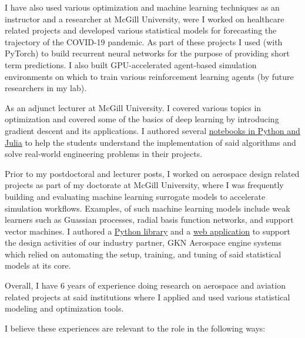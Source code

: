 \documentclass[12pt]{article} %
\begin{document}
I have also used various optimization and machine learning techniques as an instructor and a researcher at McGill University, were I worked on healthcare related projects and developed various statistical models for forecasting the trajectory of the COVID-19 pandemic. As part of these projects I used (with PyTorch) to build recurrent neural networks for the purpose of providing short term predictions. I also built GPU-accelerated agent-based simulation environments on which to train various reinforcement learning agents (by future researchers in my lab). 
\medskip %

As an adjunct lecturer at McGill University. I covered various topics in optimization and covered some of the basics of deep learning by introducing gradient descent and its applications. I authored several \href{https://github.com/khbalhandawi/MECH559_notebooks}{notebooks in Python and Julia} to help the students understand the implementation of said algorithms and solve real-world engineering problems in their projects.
\medskip %

Prior to my postdoctoral and lecturer posts, I worked on aerospace design related projects as part of my doctorate at McGill University, where I was frequently building and evaluating machine learning surrogate models to accelerate simulation workflows. Examples, of such machine learning models include weak learners such as Guassian processes, radial basis function networks, and support vector machines. I authored a \href{https://sed-group.github.io/mvmlib/index.html}{Python library} and a \href{https://github.com/khbalhandawi/scale_AM_webapp}{web application} to support the design activities of our industry partner, GKN Aerospace engine systems which relied on automating the setup, training, and tuning of said statistical models at its core.
\medskip %

Overall, I have 6 years of experience doing research on aerospace and aviation related projects at said institutions where I applied and used various statistical modeling and optimization tools.
\medskip %

I believe these experiences are relevant to the role in the following ways: 
\end{document}
